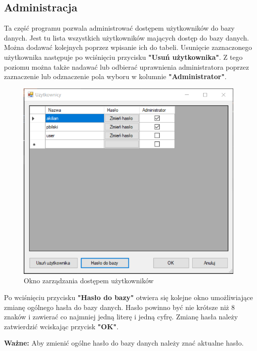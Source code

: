\subsection{Administracja}
\label{admin}

Ta część programu pozwala administrować dostępem użytkowników do bazy danych. Jest tu lista wszystkich użytkowników mających dostęp do bazy danych. Można dodawać kolejnych poprzez wpisanie ich do tabeli. Usunięcie zaznaczonego użytkownika następuje po wciśnięciu przycisku \textbf{"Usuń użytkownika"}. Z tego poziomu można także nadawać lub odbierać uprawnienia administratora poprzez zaznaczenie lub odznaczenie pola wyboru w kolumnie \textbf{"Administrator"}.

\begin{figure}[htb]
	\centering
	\includegraphics{obrazki/Logowanie/administracja.png}
	\caption{Okno zarządzania dostępem użytkowników}
	\label{administracja}
\end{figure}

Po wciśnięciu przycisku \textbf{"Hasło do bazy"} otwiera się kolejne okno umożliwiające zmianę ogólnego hasła do bazy danych. Hasło powinno być nie krótsze niż 8 znaków i zawierać co najmniej jedną literę i jedną cyfrę. Zmianę hasła należy zatwierdzić wciskając przycisk \textbf{"OK"}.

\textbf{Ważne:} Aby zmienić ogólne hasło do bazy danych należy znać aktualne hasło.

